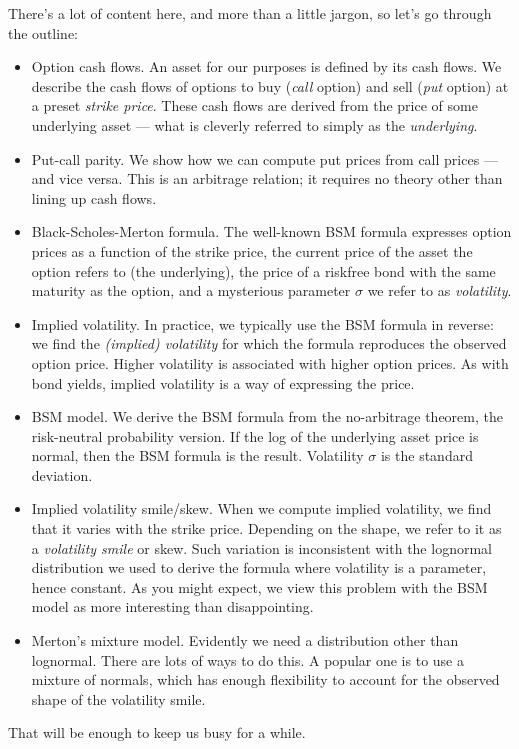 \documentclass[11pt]{article}
\begin{document}
There's a lot of content here, and more than a little jargon,
so let's go through the outline:
\begin{itemize}
\item Option cash flows.  An asset for our purposes is defined by its cash flows.
We describe the cash flows of options to buy ({\it call\/} option) and sell ({\it put\/} option)
at a preset {\it strike price\/}.
These cash flows are derived from the price of some underlying asset --- what is
cleverly referred to simply as the {\it underlying\/}.
\item Put-call parity.  We show how we can compute put prices from call prices ---
and vice versa.  This is an arbitrage relation; it requires no theory other than
lining up cash flows.
\item Black-Scholes-Merton formula.
The well-known BSM formula expresses option prices as a function of the strike price,
the current price of the asset the option refers to (the underlying),
the price of a riskfree bond with the same maturity as the option,
and a mysterious parameter $\sigma$ we refer to as {\it volatility\/}.
\item Implied volatility.  In practice, we typically use the BSM formula in reverse:
we find the {\it (implied) volatility\/} for which the formula reproduces the observed option price.
Higher volatility is associated with higher option prices.
As with bond yields, implied volatility is a way of expressing the price.
\item BSM model.  We derive the BSM formula from the no-arbitrage theorem,
the risk-neutral probability version.
If the log of the underlying asset price is normal, then the BSM formula is the result.
Volatility $\sigma$ is the standard deviation.

\item Implied volatility smile/skew.
When we compute implied volatility, we find that it varies with the strike price.
Depending on the shape, we refer to it as a {\it volatility smile\/} or skew.
Such variation is inconsistent with the lognormal distribution we used to derive the formula
where volatility is a parameter, hence constant.
As you might expect, we view this problem with the BSM model
as more interesting than disappointing.

\item Merton's mixture model.  Evidently we need a distribution other than lognormal.
There are lots of ways to do this.
A popular one is to use a mixture of normals, which has enough flexibility to account for the
observed shape of the volatility smile.

\end{itemize}
That will be enough to keep us busy for a while.
\end{document}
